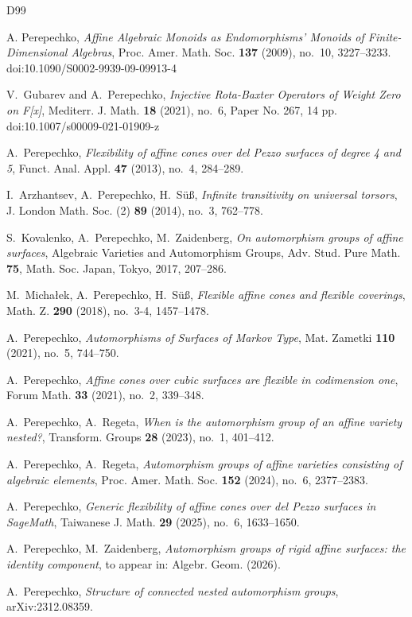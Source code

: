 
\begin{thebibliography}{D99}

\setlength{\itemsep}{-\parsep}

A. Perepechko, \emph{Affine Algebraic Monoids as Endomorphisms' Monoids of Finite-Dimensional Algebras}, Proc. Amer. Math. Soc. \textbf{137} (2009), no.~10, 3227--3233. doi:10.1090/S0002-9939-09-09913-4

V.~Gubarev and A.~Perepechko, \emph{Injective Rota-Baxter Operators of Weight Zero on F[x]}, Mediterr. J. Math. \textbf{18} (2021), no.~6, Paper No. 267, 14 pp. doi:10.1007/s00009-021-01909-z

A.~Perepechko,
\textit{Flexibility of affine cones over del Pezzo surfaces of degree 4 and 5},
Funct. Anal. Appl. \textbf{47} (2013), no.~4, 284--289.

I.~Arzhantsev, A.~Perepechko, H.~S\"u\ss,
\textit{Infinite transitivity on universal torsors},
J. London Math. Soc. (2) \textbf{89} (2014), no.~3, 762--778.

S.~Kovalenko, A.~Perepechko, M.~Zaidenberg,
\textit{On automorphism groups of affine surfaces},
Algebraic Varieties and Automorphism Groups,
Adv. Stud. Pure Math. \textbf{75}, Math. Soc. Japan, Tokyo, 2017, 207--286.


M.~Micha\l ek, A.~Perepechko, H.~S\"u\ss,
\textit{Flexible affine cones and flexible coverings},
Math. Z. \textbf{290} (2018), no.~3-4, 1457--1478.

A.~Perepechko,
\textit{Automorphisms of Surfaces of Markov Type},
Mat. Zametki \textbf{110} (2021), no.~5, 744--750.


A.~Perepechko,
\textit{Affine cones over cubic surfaces are flexible in codimension one},
Forum Math. \textbf{33} (2021), no.~2, 339--348.

A.~Perepechko, A.~Regeta,
\textit{When is the automorphism group of an affine variety nested?},
Transform. Groups \textbf{28} (2023), no.~1, 401--412.

A.~Perepechko, A.~Regeta,
\textit{Automorphism groups of affine varieties consisting of algebraic elements},
Proc. Amer. Math. Soc. \textbf{152} (2024), no.~6, 2377--2383.

A.~Perepechko,
\textit{Generic flexibility of affine cones over del Pezzo surfaces in SageMath},
 Taiwanese J. Math. \textbf{29} (2025), no.~6, 1633--1650.

A.~Perepechko, M.~Zaidenberg,
\textit{Automorphism groups of rigid affine surfaces: the identity component},
to appear in: Algebr. Geom. (2026).

A.~Perepechko,
\textit{Structure of connected nested automorphism groups}, arXiv:2312.08359.

\end{thebibliography}
